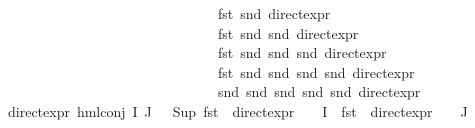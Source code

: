 \begin{isabellebody}
\ \ \ \ \ \ \ \ \ \ \ \ \ \ \ \ \ \ \ \ \ \ \ \ \ \ \ \ \ \ \ \ fst\ {\isacharparenleft}{\kern0pt}snd\ {\isacharparenleft}{\kern0pt}direct{\isacharunderscore}{\kern0pt}expr\ {\isasymphi}{\isacharparenright}{\kern0pt}{\isacharparenright}{\kern0pt}{\isacharcomma}{\kern0pt}\ \isanewline
\ \ \ \ \ \ \ \ \ \ \ \ \ \ \ \ \ \ \ \ \ \ \ \ \ \ \ \ \ \ \ \ fst\ {\isacharparenleft}{\kern0pt}snd\ {\isacharparenleft}{\kern0pt}snd\ {\isacharparenleft}{\kern0pt}direct{\isacharunderscore}{\kern0pt}expr\ {\isasymphi}{\isacharparenright}{\kern0pt}{\isacharparenright}{\kern0pt}{\isacharparenright}{\kern0pt}{\isacharcomma}{\kern0pt}\ \isanewline
\ \ \ \ \ \ \ \ \ \ \ \ \ \ \ \ \ \ \ \ \ \ \ \ \ \ \ \ \ \ \ \ fst\ {\isacharparenleft}{\kern0pt}snd\ {\isacharparenleft}{\kern0pt}snd\ {\isacharparenleft}{\kern0pt}snd\ {\isacharparenleft}{\kern0pt}direct{\isacharunderscore}{\kern0pt}expr\ {\isasymphi}{\isacharparenright}{\kern0pt}{\isacharparenright}{\kern0pt}{\isacharparenright}{\kern0pt}{\isacharparenright}{\kern0pt}{\isacharcomma}{\kern0pt}\ \isanewline
\ \ \ \ \ \ \ \ \ \ \ \ \ \ \ \ \ \ \ \ \ \ \ \ \ \ \ \ \ \ \ \ fst\ {\isacharparenleft}{\kern0pt}snd\ {\isacharparenleft}{\kern0pt}snd\ {\isacharparenleft}{\kern0pt}snd\ {\isacharparenleft}{\kern0pt}snd\ {\isacharparenleft}{\kern0pt}direct{\isacharunderscore}{\kern0pt}expr\ {\isasymphi}{\isacharparenright}{\kern0pt}{\isacharparenright}{\kern0pt}{\isacharparenright}{\kern0pt}{\isacharparenright}{\kern0pt}{\isacharparenright}{\kern0pt}{\isacharcomma}{\kern0pt}\ \isanewline
\ \ \ \ \ \ \ \ \ \ \ \ \ \ \ \ \ \ \ \ \ \ \ \ \ \ \ \ \ \ \ \ snd\ {\isacharparenleft}{\kern0pt}snd\ {\isacharparenleft}{\kern0pt}snd\ {\isacharparenleft}{\kern0pt}snd\ {\isacharparenleft}{\kern0pt}snd\ {\isacharparenleft}{\kern0pt}direct{\isacharunderscore}{\kern0pt}expr\ {\isasymphi}{\isacharparenright}{\kern0pt}{\isacharparenright}{\kern0pt}{\isacharparenright}{\kern0pt}{\isacharparenright}{\kern0pt}{\isacharparenright}{\kern0pt}{\isacharparenright}{\kern0pt}{\isachardoublequoteclose}\ {\isacharbar}{\kern0pt}\isanewline
\ \ {\isachardoublequoteopen}direct{\isacharunderscore}{\kern0pt}expr\ {\isacharparenleft}{\kern0pt}hml{\isacharunderscore}{\kern0pt}conj\ I\ J\ {\isasymPhi}{\isacharparenright}{\kern0pt}\ {\isacharequal}{\kern0pt}\ {\isacharparenleft}{\kern0pt}Sup\ {\isacharparenleft}{\kern0pt}{\isacharparenleft}{\kern0pt}fst\ {\isasymcirc}\ direct{\isacharunderscore}{\kern0pt}expr\ {\isasymcirc}\ {\isasymPhi}{\isacharparenright}{\kern0pt}\ {\isacharbackquote}{\kern0pt}\ I\ {\isasymunion}\ {\isacharparenleft}{\kern0pt}fst\ {\isasymcirc}\ direct{\isacharunderscore}{\kern0pt}expr\ {\isasymcirc}\ {\isasymPhi}{\isacharparenright}{\kern0pt}\ {\isacharbackquote}{\kern0pt}\ J{\isacharparenright}{\kern0pt}{\isacharcomma}{\kern0pt}\ \isanewline

\end{isabellebody}
